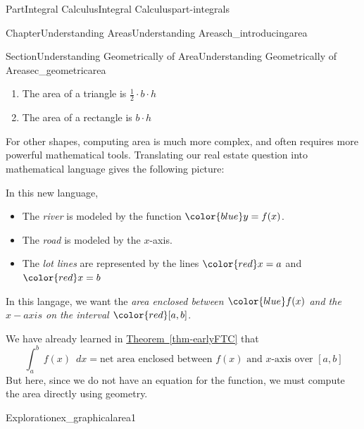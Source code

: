 \documentclass{tufte-book}
\newcommand{\xreffont}{\relax}
\numberwithin{equation}{chapter}
\newcommand{\red}[1]{   {\color{red}   #1}   }
\newcommand{\blue}[1]{  {\color{blue}  #1}  }
\newcommand{\intdx}[1]{{\,\int#1\,\,dx}}
\begin{document}
\begin{partptx}{Part}{Integral Calculus}{}{Integral Calculus}{}{}{part-integrals}
\begin{chapterptx}{Chapter}{Understanding Areas}{}{Understanding Areas}{}{}{ch_introducingarea}
\begin{sectionptx}{Section}{Understanding Geometrically of Area}{}{Understanding Geometrically of Area}{}{}{sec_geometricarea}
\begin{enumerate}
\item{}The area of a triangle is \(\frac{1}{2}\cdot b\cdot h\)%
\item{}The area of a rectangle is \(b\cdot h\)%
\end{enumerate}
For other shapes, computing area is much more complex, and often requires more powerful mathematical tools. Translating our real estate question into mathematical language gives the following picture:%
\begin{image}{0.25}{0.5}{0.25}{}%
%
\end{image}%
In this new language,%
\begin{itemize}[label=\textbullet]
\item{}The \emph{river} is modeled by the function \(\blue{y=f(x)}\).%
\item{}The \emph{road} is modeled by the \(x\)-axis.%
\item{}The \emph{lot lines} are represented by the lines \(\red{x=a}\) and \(\red{x=b}\)%
\end{itemize}
In this langage, we want the \emph{area enclosed between \(\blue{f(x)}\) and the \(x-axis\) on the interval \(\red{[a,b]}\)}.%
\par
We have already learned in \hyperref[thm-earlyFTC]{Theorem~{\xreffont\ref{thm-earlyFTC}}} that%
\begin{equation*}
\intdx{_a^b \, f(x) \, } = \text{net area enclosed between } f(x) \text{ and } x\text{-axis over }[a,b]
\end{equation*}
But here, since we do not have an equation for the function, we must compute the area directly using geometry.%
\begin{exploration}{Exploration}{}{ex_graphicalarea1}%

\end{exploration}
\end{sectionptx}
\end{chapterptx}
\end{partptx}
\end{document}
